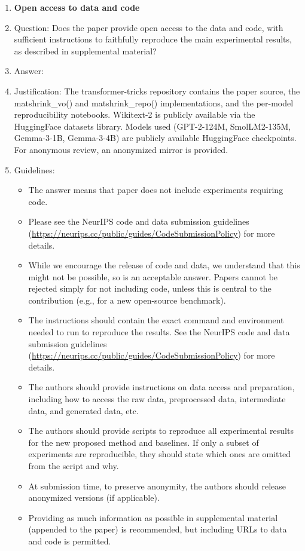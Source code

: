 \begin{enumerate}
\item {\bf Open access to data and code}
    \item[] Question: Does the paper provide open access to the data and code, with sufficient instructions to faithfully reproduce the main experimental results, as described in supplemental material?
    \item[] Answer: \answerYes{} %
    \item[] Justification: The transformer-tricks repository contains the paper source, the matshrink\_vo() and matshrink\_repo() implementations, and the per-model reproducibility notebooks. Wikitext-2 is publicly available via the HuggingFace datasets library. Models used (GPT-2-124M, SmolLM2-135M, Gemma-3-1B, Gemma-3-4B) are publicly available HuggingFace checkpoints. For anonymous review, an anonymized mirror is provided.
    \item[] Guidelines:
    \begin{itemize}
        \item The answer \answerNA{} means that paper does not include experiments requiring code.
        \item Please see the NeurIPS code and data submission guidelines (\url{https://neurips.cc/public/guides/CodeSubmissionPolicy}) for more details.
        \item While we encourage the release of code and data, we understand that this might not be possible, so \answerNo{} is an acceptable answer. Papers cannot be rejected simply for not including code, unless this is central to the contribution (e.g., for a new open-source benchmark).
        \item The instructions should contain the exact command and environment needed to run to reproduce the results. See the NeurIPS code and data submission guidelines (\url{https://neurips.cc/public/guides/CodeSubmissionPolicy}) for more details.
        \item The authors should provide instructions on data access and preparation, including how to access the raw data, preprocessed data, intermediate data, and generated data, etc.
        \item The authors should provide scripts to reproduce all experimental results for the new proposed method and baselines. If only a subset of experiments are reproducible, they should state which ones are omitted from the script and why.
        \item At submission time, to preserve anonymity, the authors should release anonymized versions (if applicable).
        \item Providing as much information as possible in supplemental material (appended to the paper) is recommended, but including URLs to data and code is permitted.
    \end{itemize}


\end{enumerate}
